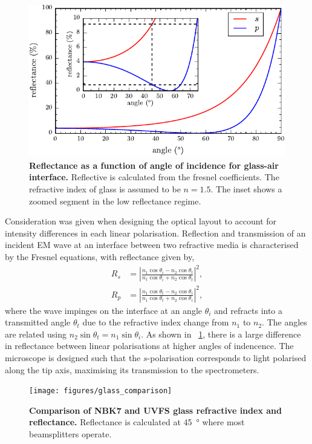 \documentclass{article}
\begin{document}
\begin{figure}[h]
\centering
\includegraphics{figures/fresnel_coefficients}
\caption*
{\textbf{Reflectance as a function of angle of incidence for glass-air interface.} Reflective is calculated from the fresnel coefficients. The refractive index of glass is assumed to be $n=1.5$. The inset shows a zoomed segment in the low reflectance regime.}
\label{fig:fresnel}
\end{figure}

Consideration was given when designing the optical layout to account for intensity differences in each linear polarisation. Reflection and transmission of an incident EM wave at an interface between two refractive media is characterised by the Fresnel equations, with reflectance given by,
\begin{align}
R_s &= \left| \frac{n_1\cos{\theta_i} - n_2\cos{\theta_t}}{n_1\cos{\theta_i} + n_2\cos{\theta_t}} \right|^2, \\
R_p &= \left| \frac{n_1\cos{\theta_t} - n_2\cos{\theta_i}}{n_1\cos{\theta_t} + n_2\cos{\theta_i}} \right|^2,
\end{align}
where the wave impinges on the interface at an angle $\theta_i$ and refracts into a transmitted angle $\theta_t$ due to the refractive index change from $n_1$ to $n_2$. The angles are related using $n_2\sin{\theta_t} = n_1\sin{\theta_i}$. As shown in \figurename~\ref{fig:fresnel}, there is a large difference in reflectance between linear polarisations at higher angles of indencence. The microscope is designed such that the $s$-polarisation corresponds to light polarised along the tip axis, maximising its transmission to the spectrometers.

\begin{figure}[h]
\centering
\texttt{[image: figures/glass\_comparison]}
\caption*
{\textbf{Comparison of NBK7 and UVFS glass refractive index and reflectance.} Reflectance is calculated at \SI{45}{\degree} where most beamsplitters operate.}
\label{fig:glass_comparison}
\end{figure}
\end{document}
